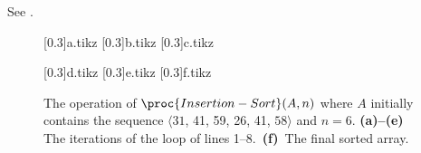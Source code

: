 See .
\begin{figure}[htb]
    \hfill\subcaptionbox{\label{fig:2.1-1a}}[0.3\textwidth]{{a.tikz}}
    \hfill\subcaptionbox{\label{fig:2.1-1b}}[0.3\textwidth]{{b.tikz}}
    \hfill\subcaptionbox{\label{fig:2.1-1c}}[0.3\textwidth]{{c.tikz}}
    \par\medskip
    \hfill\subcaptionbox{\label{fig:2.1-1d}}[0.3\textwidth]{{d.tikz}}
    \hfill\subcaptionbox{\label{fig:2.1-1e}}[0.3\textwidth]{{e.tikz}}
    \hfill\subcaptionbox{\label{fig:2.1-1f}}[0.3\textwidth]{{f.tikz}}
    \caption{The operation of $\proc{Insertion-Sort}(A,n)$ where $A$ initially contains the sequence $\langle31$, 41, 59, 26, 41, $58\rangle$ and $n=6$.
    \textbf{(a)--(e)}\, The iterations of the  loop of lines 1--8.\,
    \textbf{(f)}\, The final sorted array.} \label{fig:2.1-1}
\end{figure}
